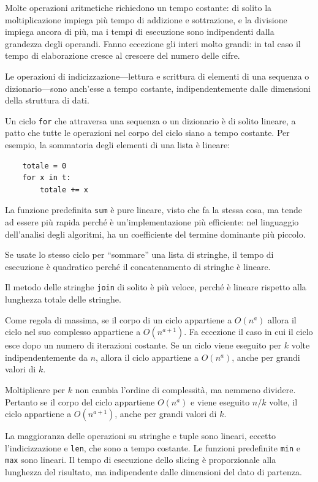 \documentclass[10pt]{book}
\begin{document}
Molte operazioni aritmetiche richiedono un tempo costante: di solito la moltiplicazione impiega più tempo di addizione e sottrazione, e la divisione impiega ancora di più, ma i tempi di esecuzione sono indipendenti dalla grandezza degli operandi. Fanno eccezione gli interi molto grandi: in tal caso il tempo di elaborazione cresce al crescere del numero delle cifre.

Le operazioni di indicizzazione---lettura e scrittura di elementi di una sequenza o dizionario---sono anch'esse a tempo costante, indipendentemente dalle dimensioni della struttura di dati.

Un ciclo {\tt for} che attraversa una sequenza o un dizionario è di solito lineare, a patto che tutte le operazioni nel corpo del ciclo siano a tempo costante. Per esempio, la sommatoria degli elementi di una lista è lineare:

\begin{verbatim}
    totale = 0
    for x in t:
        totale += x
\end{verbatim}

La funzione predefinita {\tt sum} è pure lineare, visto che fa la stessa cosa, ma tende ad essere più rapida perché è un'implementazione più efficiente: nel linguaggio dell'analisi degli algoritmi, ha un coefficiente del termine dominante più piccolo.

Se usate lo stesso ciclo per ``sommare'' una lista di stringhe, il tempo di esecuzione è quadratico perché il concatenamento di stringhe è lineare.

Il metodo delle stringhe {\tt join} di solito è più veloce, perché è lineare rispetto alla lunghezza totale delle stringhe.

Come regola di massima, se il corpo di un ciclo appartiene a $O(n^a)$ allora il ciclo nel suo complesso appartiene a $O(n^{a+1})$.  Fa eccezione il caso in cui il ciclo esce dopo un numero di iterazioni costante. Se un ciclo viene eseguito per $k$ volte indipendentemente da $n$, allora il ciclo appartiene a $O(n^a)$, anche per grandi valori di $k$.

Moltiplicare per $k$ non cambia l'ordine di complessità, ma nemmeno dividere. Pertanto se il corpo del ciclo appartiene $O(n^a)$ e viene eseguito
$n/k$ volte, il ciclo appartiene a $O(n^{a+1})$, anche per grandi valori di $k$.

La maggioranza delle operazioni su stringhe e tuple sono lineari, eccetto l'indicizzazione e {\tt   len}, che sono a tempo costante. Le funzioni predefinite {\tt min} e {\tt max} sono lineari. Il tempo di esecuzione dello slicing è proporzionale alla lunghezza del risultato, ma indipendente dalle dimensioni del dato di partenza.
\end{document}
